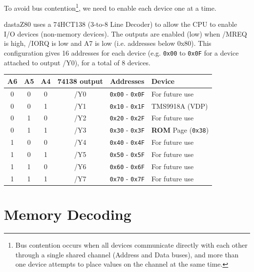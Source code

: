 \documentclass[a4paper,11pt]{article}
\begin{document}
    To avoid bus contention\footnote{Bus contention occurs when all devices
    communicate directly with each other through a single shared channel
    (Address and Data buses), and more than one device attempts to place values
    on the channel at the same time.}, we need to enable each device one at a
    time.

    dastaZ80 uses a 74HCT138 (3-to-8 Line Decoder) to allow the CPU to enable
    I/O devices (non-memory devices). The outputs are enabled (low) when /MREQ
    is high, /IORQ is low and A7 is low (i.e. addresses below 0x80). This
    configuration gives 16 addresses for each device (e.g. \texttt{0x00} to
    \texttt{0x0F} for a device attached to output /Y0), for a total of 8 devices.

    \begin{tabular}{| c | c | c | c | c | m{4.5cm} | }
        \hline
        \rowcolor{lightgray}
        A6 & A5 & A4 & 74138 output & Addresses & Device\\
        \hline
        0 & 0 & 0 & /Y0 & \texttt{0x00} - \texttt{0x0F} & For future use\\
        \hline
        0 & 0 & 1 & /Y1 & \texttt{0x10} - \texttt{0x1F} & TMS9918A (VDP)\\
        \hline
        0 & 1 & 0 & /Y2 & \texttt{0x20} - \texttt{0x2F} & For future use\\
        \hline
        0 & 1 & 1 & /Y3 & \texttt{0x30} - \texttt{0x3F} & \textbf{ROM} Page
        (\texttt{0x38})\\
        \hline
        1 & 0 & 0 & /Y4 & \texttt{0x40} - \texttt{0x4F} & For future use\\
        \hline
        1 & 0 & 1 & /Y5 & \texttt{0x50} - \texttt{0x5F} & For future use\\
        \hline
        1 & 1 & 0 & /Y6 & \texttt{0x60} - \texttt{0x6F} & For future use\\
        \hline
        1 & 1 & 1 & /Y7 & \texttt{0x70} - \texttt{0x7F} & For future use\\
        \hline
    \end{tabular}
    
    \pagebreak
    \section{Memory Decoding}
\end{document}
